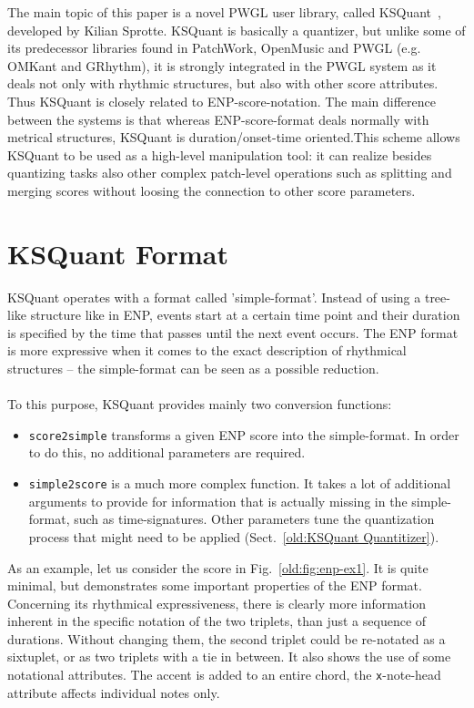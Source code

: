 \documentclass[runningheads,a4paper]{llncs}
\begin{document}
The main topic of this paper is a novel PWGL user library, called
KSQuant~\cite{agon}, developed by Kilian Sprotte. KSQuant is
basically a quantizer, but unlike some of its predecessor libraries
found in PatchWork, OpenMusic and PWGL (e.g. OMKant and GRhythm), it
is strongly integrated in the PWGL system as it deals not only with
rhythmic structures, but also with other score attributes. Thus
KSQuant is closely related to ENP-score-notation. The main difference
between the systems is that whereas ENP-score-format deals normally
with metrical structures, KSQuant is duration/onset-time oriented.This
scheme allows KSQuant to be used as a high-level manipulation tool: it
can realize besides quantizing tasks also other complex patch-level
operations such as splitting and merging scores without loosing the
connection to other score parameters.

\section{KSQuant  Format}\label{old:KSQuant format}
KSQuant operates with a format called 'simple-format'. Instead of
using a tree-like structure like in ENP, events start at a certain
time point and their duration is specified by the time that passes
until the next event occurs. The ENP format is more expressive when it
comes to the exact description of rhythmical structures -- the
simple-format can be seen as a possible reduction.
\\
\\
To this purpose, KSQuant provides mainly two conversion functions:
\begin{itemize}
\item \texttt{score2simple} transforms a given ENP score into the
  simple-format.  In order to do this, no additional parameters are
  required.
\item \texttt{simple2score} is a much more complex function. It takes
  a lot of additional arguments to provide for information that is
  actually missing in the simple-format, such as
  time-signatures. Other parameters tune the quantization process that
  might need to be applied (Sect.~\ref{old:KSQuant Quantitizer}).
\end{itemize}

As an example, let us consider the score in Fig.~\ref{old:fig:enp-ex1}. It
is quite minimal, but demonstrates some important properties of the
ENP format. Concerning its rhythmical expressiveness, there is clearly
more information inherent in the specific notation of the two
triplets, than just a sequence of durations. Without changing them,
the second triplet could be re-notated as a sixtuplet, or as two
triplets with a tie in between.  It also shows the use of some
notational attributes. The accent is added to an entire chord, the
\texttt{x}-note-head attribute affects individual notes only.
\end{document}

